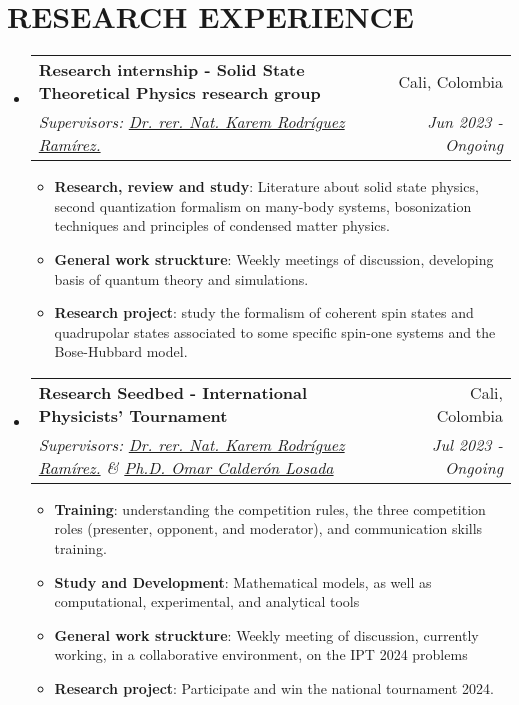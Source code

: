 \documentclass[a4paper,20pt]{article}
\makeatletter
\newcommand{\resumeItem}[2]{
  \item\small{
    \textbf{#1}{: #2 \vspace{-2pt}}
  }
}
\newcommand{\resumeSubheading}[4]{
  \vspace{-1pt}\item
    \begin{tabular*}{0.97\textwidth}{l@{\extracolsep{\fill}}r}
      \textbf{#1} & #2 \\
      \textit{#3} & \textit{#4} \\
    \end{tabular*}\vspace{-5pt}
}
\newcommand{\resumeSubHeadingListStart}{\begin{itemize}[leftmargin=*]}
\newcommand{\resumeSubHeadingListEnd}{\end{itemize}}
\newcommand{\resumeItemListStart}{\begin{itemize}}
\newcommand{\resumeItemListEnd}{\end{itemize}\vspace{-5pt}}
\makeatother
\begin{document}
\section{\textbf{RESEARCH EXPERIENCE}}
  \resumeSubHeadingListStart
    \resumeSubheading{Research internship - Solid State Theoretical Physics research group}{\faMapMarker \hspace{1mm} Cali, Colombia}
    {Supervisors: \href{https://sites.google.com/a/correounivalle.edu.co/karen-rodriguez/home}{Dr. rer. Nat. Karem Rodríguez Ramírez. \faExternalLink }}{Jun 2023 - Ongoing}
    \resumeItemListStart
    \vspace{-5pt}
        \resumeItem{Research, review and study}
          {Literature about solid state physics, second quantization formalism on many-body systems, bosonization techniques and principles of condensed matter physics.}
          \vspace{-5pt}
          \resumeItem{General work struckture}
          {Weekly meetings of discussion, developing basis of quantum theory and simulations. }
        \vspace{-5pt}
          \resumeItem{Research project}{study the formalism of coherent spin states and quadrupolar states associated to some specific spin-one systems and the Bose-Hubbard model.}
        \vspace{-5pt}
      \resumeItemListEnd
\vspace{1mm}
    \resumeSubheading
		{Research Seedbed - International Physicists' Tournament }{\faMapMarker \hspace{1mm} Cali, Colombia}
		{Supervisors: \href{https://sites.google.com/a/correounivalle.edu.co/karen-rodriguez/home}{Dr. rer. Nat. Karem Rodríguez Ramírez.\faExternalLink } \& \href{https://ciencias.univalle.edu.co/departamento-de-fisica/personal/docentes/omar-calderon-losada}{Ph.D. Omar Calderón Losada \faExternalLink }}{Jul 2023 -  Ongoing}
		\resumeItemListStart
      \vspace{-5pt}
        \resumeItem{Training}
          {understanding the competition rules, the three competition roles (presenter, opponent, and moderator), and communication skills training.}
              \vspace{-5pt}
        \resumeItem{Study and Development}
          {Mathematical models, as well as computational, experimental, and analytical tools}
              \vspace{-5pt}
          \resumeItem{General work struckture}{Weekly meeting of discussion, currently working, in a collaborative environment, on the IPT 2024 problems}
              \vspace{-5pt}
        \resumeItem{Research project}{Participate and win the national tournament 2024.}
            \vspace{-5pt}
		\resumeItemListEnd
\resumeSubHeadingListEnd
\end{document}
